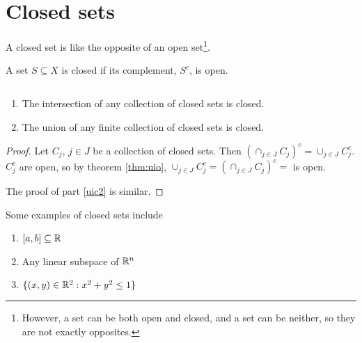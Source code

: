 \section{Closed sets}

A closed set is like the opposite of an open set\footnote{However, a set can be
both open and closed, and a set can be neither, so they are not
exactly opposites. }. 
\begin{definition}
  A set $S \subseteq X$ is closed if its complement, $S^c$, is open. 
\end{definition}
\begin{theorem} $\;$\label{thm:uic}
  \begin{enumerate}
  \item The intersection of any collection of closed sets is closed.
  \item\label{uic2} The union of any finite collection of closed sets is closed. 
  \end{enumerate}
\end{theorem}
\begin{proof}
  Let $C_j$, $j\in J$ be a collection of closed sets. Then 
  $ \left(\cap_{j \in J} C_j\right)^c = \cup_{j \in J}
  C^c_j $. 
  $C^c_j$ are open, so by theorem \ref{thm:uio},  $\cup_{j \in J}
  C^c_j = \left(\cap_{j \in J} C_j\right)^c =$ is open.  
  
  The proof of part \ref{uic2} is similar. 
\end{proof}

\begin{example}
  Some examples of closed sets include
  \begin{enumerate}
  \item $[a,b] \subseteq \mathbb{R}$
  \item Any linear subspace of $\mathbb{R}^n$
  \item $\{(x,y) \in \mathbb{R}^2: x^2 + y^2 \leq 1\}$
  \end{enumerate}
\end{example}

